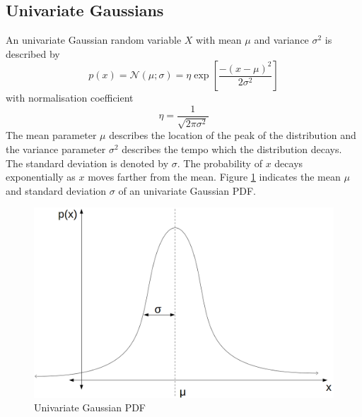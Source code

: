 \documentclass[12pt,oneside,openany,a4paper, %
afrikaans,english,
]{memoir}
\numberwithin{equation}{chapter}
\begin{document}
\subsection{Univariate Gaussians}
An univariate Gaussian random variable $X$ with mean $\mu$ and variance $\sigma^2$ is described by
\begin{equation}\label{eq:1}
p(x) = \mathcal{N}(\mu;\sigma) = \eta\exp\left[\frac{-(x-\mu)^2}{2\sigma^2}\right]
\end{equation}
with normalisation coefficient 
\begin{equation}\label{eq:2}
\eta = \frac{1}{\sqrt{2\pi\sigma^2}}
\end{equation}
The mean parameter $\mu$ describes the location of the peak of the distribution and the variance parameter $\sigma^2$ describes the tempo which the distribution decays. The standard deviation is denoted by $\sigma$. The probability of $x$ decays exponentially as $x$ moves farther from the mean. Figure \ref{fig:gPDF1} indicates the mean $\mu$ and standard deviation $\sigma$ of an univariate Gaussian PDF.

\begin{figure}[H]
  \includegraphics[width=0.7\linewidth]{Figures/univariate.png}
  \centering
  \caption{Univariate Gaussian PDF}
  \label{fig:gPDF1}
\end{figure}
\end{document}
